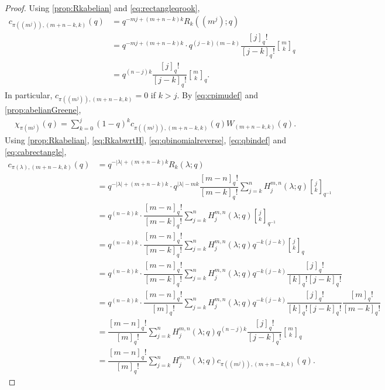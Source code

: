 \documentclass[12pt,reqno]{amsart}
\theoremstyle{plain}
\theoremstyle{definition}
\theoremstyle{remark}
\theoremstyle{example}
\numberwithin{equation}{section}
\newcommand{\Area}{\mathrm{Area}}
\begin{document}
\begin{proof}
	Using \autoref{prop:Rkabelian} and \eqref{eq:rectangleqrook}, \begin{align}
		c_{\pi((m^j)),(m+n-k,k)}(q) &= q^{-mj+(m+n-k)k}R_k((m^j);q) 
		\nonumber
		\\
		&= q^{-mj+(m+n-k)k} \cdot q^{(j-k)(m-k)} \dfrac{[j]_q!}{[j-k]_q!} {m \brack k}_q
		\nonumber
		\\
		&= q^{(n-j)k} \dfrac{[j]_q!}{[j-k]_q!} {m \brack k}_q.
		\label{eq:cabrectangle}
	\end{align} In particular, $c_{\pi((m^j)),(m+n-k,k)} =0$ if $k>j$. By \eqref{eq:cpimudef} and \autoref{prop:abelianGreene}, \begin{align}\label{eq:chirectangle}
		&\chi_{\pi(m^j)}(q) = \sum_{k=0}^{j} (1-q)^k c_{\pi((m^j)),(m+n-k,k)}(q) W_{(m+n-k,k)}(q). 
	\end{align}
	Using \autoref{prop:Rkabelian}, \eqref{eq:RkabwrtH}, \eqref{eq:qbinomialreverse}, \eqref{eq:qbindef} and \eqref{eq:cabrectangle},	
	\begin{align*}
		c_{\pi(\lambda),(m+n-k,k)}(q) &= q^{-|\lambda|+(m+n-k)k}  R_k(\lambda;q) 
		\\
		&= q^{-|\lambda|+(m+n-k)k}\cdot q^{|\lambda|-mk} \dfrac{[m-n]_q!}{[m-k]_q!} \sum_{j=k}^{n} H_j^{m,n}(\lambda;q) {j \brack k}_{q^{-1}}  
		\\
		&= q^{(n-k)k}\cdot  \dfrac{[m-n]_q!}{[m-k]_q!} \sum_{j=k}^{n} H_j^{m,n}(\lambda;q) {j \brack k}_{q^{-1}}  
		\\
		&= q^{(n-k)k}\cdot  \dfrac{[m-n]_q!}{[m-k]_q!} \sum_{j=k}^{n} H_j^{m,n}(\lambda;q) q^{-k(j-k)} {j \brack k}_q
		\\
		&= q^{(n-k)k}\cdot  \dfrac{[m-n]_q!}{[m-k]_q!} \sum_{j=k}^{n} H_j^{m,n}(\lambda;q) q^{-k(j-k)} \dfrac{[j]_q!}{[k]_q! [j-k]_q!}
		\\
		&= q^{(n-k)k}\cdot  \dfrac{[m-n]_q!}{[m]_q!} \sum_{j=k}^{n} H_j^{m,n}(\lambda;q) q^{-k(j-k)} \dfrac{[j]_q!}{[k]_q! [j-k]_q!} \dfrac{[m]_q!}{[m-k]_q!}
		\\
		&= \dfrac{[m-n]_q!}{[m]_q!} \sum_{j=k}^{n} H_j^{m,n}(\lambda;q) q^{(n-j)k} \dfrac{[j]_q!}{[j-k]_q!} {m \brack k}_q
		\\
		&= \dfrac{[m-n]_q!}{[m]_q!} \sum_{j=k}^{n} H_j^{m,n}(\lambda;q) c_{\pi((m^j)),(m+n-k,k)}(q).

\end{align*}
\end{proof}
\end{document}
